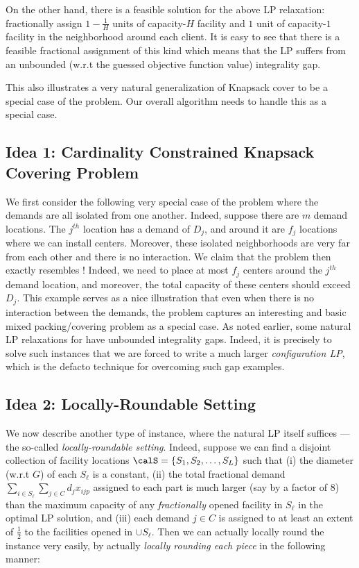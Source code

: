 On the other hand, there is a feasible solution for the above LP relaxation: fractionally assign $1-\frac1H$ units of capacity-$H$ facility and $1$ unit of capacity-$1$ facility in the neighborhood around each client. It is easy to see that there is a feasible fractional assignment of this kind which means that the LP suffers from an unbounded (w.r.t the guessed objective function value) integrality gap.

This also illustrates a very natural generalization of Knapsack cover to be a special case of the \mckc problem. Our overall algorithm needs to handle this as a special case.

\subsection{Idea 1: Cardinality Constrained Knapsack Covering Problem} \label{sec:idea1}
We first consider the following very special case of the \mckc problem where the demands are all isolated from one another. Indeed, suppose there are $m$ demand locations. The $j^{th}$ location has a demand of $D_j$, and around it are $f_j$ locations where we can install centers. Moreover, these isolated neighborhoods are very far from each other and there is no interaction. We claim that the problem then exactly resembles \cckp! Indeed, we need to place at most $f_j$ centers around the $j^{th}$ demand location, and moreover, the total capacity of these centers should exceed $D_j$. This example serves as a nice illustration that even when there is no interaction between the demands, the \mckc problem captures an interesting and basic mixed packing/covering problem as a special case. As noted earlier, some natural LP relaxations for \cckp have unbounded integrality gaps. Indeed, it is precisely to solve such instances that we are forced to write a much larger \emph{configuration LP}, which is the defacto technique for overcoming such gap examples.

\subsection{Idea 2: Locally-Roundable Setting} \label{sec:idea2}

We now describe another type of instance, where the natural LP itself suffices --- the so-called \emph{locally-roundable setting}.
 Indeed, suppose we can find a disjoint collection of facility locations $\calS = \{S_1, S_2, \ldots, S_L\}$ such that (i) the diameter (w.r.t $G$) of each $S_\ell$ is a constant, (ii) the total fractional demand $\sum_{i \in S_\ell} \sum_{j \in C} d_j x_{ijp}$ assigned to each part is much larger (say by a factor of $8$) than the maximum capacity of any \emph{fractionally} opened facility in $S_\ell$ in the optimal LP solution, and (iii) each demand $j \in C$ is assigned to at least an extent of $\frac12$ to the facilities opened in $\cup S_\ell$. Then we can actually locally round the instance very easily, by actually \emph{locally rounding each piece} in the following manner:

